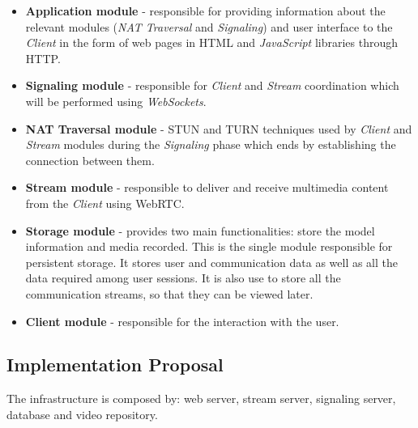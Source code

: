 \documentclass[conference,compsoc,a4paper]{IEEEtran}
\begin{document}
\begin{itemize}

\item \textbf{Application module} - responsible for providing information about the relevant modules (\emph{NAT Traversal} and \emph{Signaling}) and user interface to the \emph{Client} in the form of web pages in \gls{HTML} and \emph{JavaScript} libraries through \gls{HTTP}.
 
\item \textbf{Signaling module} - responsible for \emph{Client} and \emph{Stream} coordination which will be performed using \emph{WebSockets}.

 \item \textbf{NAT Traversal module} - \gls{STUN} and \gls{TURN} techniques used by \emph{Client} and \emph{Stream} modules during the \emph{Signaling} phase which ends by establishing the connection between them.

 \item \textbf{Stream module} - responsible to deliver and receive multimedia content from the \emph{Client} using \gls{WebRTC}. 

 \item \textbf{Storage module} - provides two main functionalities: store the model information and media recorded. This is the single module responsible for persistent storage. It stores user and communication data as well as all the data required among user sessions. It is also use to store all the communication streams, so that they can be viewed later.

 \item \textbf{Client module} - responsible for the interaction with the user.

\end{itemize}



 
\subsection{Implementation Proposal}
The infrastructure is composed by: web server, stream server, signaling server, database and video repository.
\end{document}

